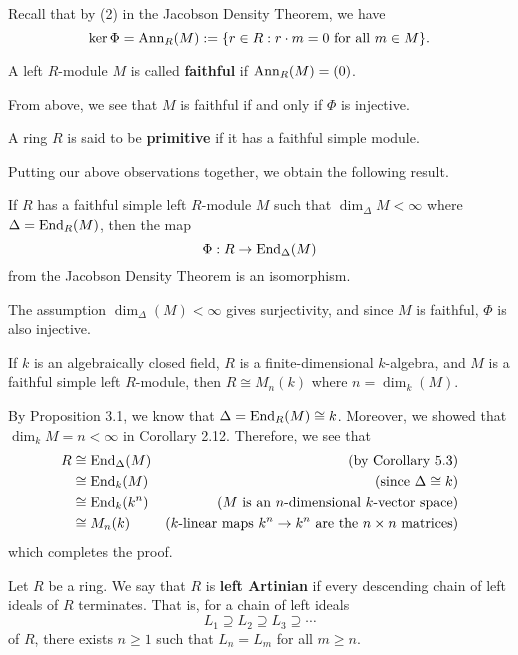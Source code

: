 Recall that by (2) in the Jacobson Density Theorem, we have 
\[ \ker \Phi = \operatorname{Ann}_R(M) := \{r \in R : r \cdot m = 0 \text{ for all } m \in M\}. \]

\begin{defn}{}
A left $R$-module $M$ is called {\bf faithful} if $\operatorname{Ann}_R(M) = (0)$. 
\end{defn}

From above, we see that $M$ is faithful if and only if $\Phi$ is injective. 

\begin{defn}{}
A ring $R$ is said to be {\bf primitive} if it has a faithful simple module.
\end{defn}

Putting our above observations together, we obtain the following result. 

\begin{cor}{}
If $R$ has a faithful simple left $R$-module $M$ such that $\dim_\Delta M < \infty$ where 
$\Delta = \operatorname{End}_R(M)$, then the map 
\[ \Phi : R \to \operatorname{End}_\Delta(M) \]
from the Jacobson Density Theorem is an isomorphism. 
\end{cor}
\begin{pf}
The assumption $\dim_\Delta(M) < \infty$ gives surjectivity, and since $M$ is faithful, 
$\Phi$ is also injective.
\end{pf}

\begin{cor}{}
If $k$ is an algebraically closed field, $R$ is a finite-dimensional $k$-algebra, and $M$ is a 
faithful simple left $R$-module, then $R \cong M_n(k)$ where $n = \dim_k(M)$. 
\end{cor}
\begin{pf}
By Proposition 3.1, we know that $\Delta = \operatorname{End}_R(M) \cong k$. Moreover, we showed that 
$\dim_k M = n < \infty$ in Corollary 2.12. Therefore, we see that 
\begin{align*}
    R &\cong \operatorname{End}_\Delta(M) & \text{(by Corollary 5.3)} \\
    &\cong \operatorname{End}_k(M) & \text{(since $\Delta \cong k$)} \\
    &\cong \operatorname{End}_k(k^n) & \text{($M$ is an $n$-dimensional $k$-vector space)} \\
    &\cong M_n(k) & \text{($k$-linear maps $k^n \to k^n$ are the $n \times n$ matrices)} 
\end{align*}
which completes the proof.
\end{pf}

\begin{defn}{}
Let $R$ be a ring. We say that $R$ is {\bf left Artinian} if every descending chain of left ideals of $R$
terminates. That is, for a chain of left ideals 
\[ L_1 \supseteq L_2 \supseteq L_3 \supseteq \cdots \]
of $R$, there exists $n \geq 1$ such that $L_n = L_m$ for all $m \geq n$. 
\end{defn}

